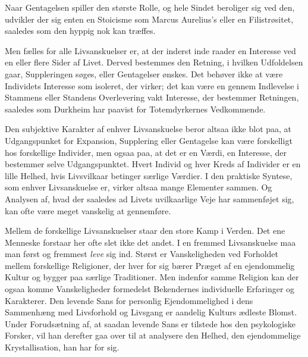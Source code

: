 \documentclass[12pt]{article}
\newcommand{\apage}[1]{\marginnote{\footnotesize\textit{[#1]}}}
\begin{document}
       Naar Gentagelsen spiller den største Rolle, og hele Sindet beroliger sig
ved den, udvikler der sig enten en Stoicisme som Marcus Aurelius's eller en
Filistrøsitet, saaledes som den hyppig nok kan træffes.

Men fælles for alle Livsanskuelser er, at der inderst inde raader en Interesse
ved en eller flere Sider af Livet. Derved bestemmes den Retning, i hvilken
Udfoldelsen gaar, Suppleringen søges, eller Gentagelser ønskes. Det behøver
ikke at være Individets Interesse som isoleret, der virker; det kan være en
gennem Indlevelse i Stammens eller Standens Overlevering vakt Interesse, der
bestemmer Retningen, saaledes som Durkheim har paavist for Totemdyrkernes
Vedkommende.

Den subjektive Karakter af enhver Livsanskuelse beror altsaa ikke blot paa, at
Udgangspunket for Expansion, Supplering eller Gentagelse kan være forskelligt
hos forskellige Individer, men ogsaa paa, at det er en Værdi, en Interesse, der
bestemmer selve Udgangspunktet. Hvert Individ og hver Kreds af Individer er en
lille Helhed, hvis Livsvilkaar betinger særlige Værdier. I den praktiske
Syntese, som enhver Livsanskuelse er, virker altsaa mange Elementer sammen. Og
Analysen af, hvad der saaledes ad Livets uvilkaarlige Veje har sammenføjet sig,
kan ofte være meget vanskelig at gennemføre.

Mellem de forskellige Livsanskuelser staar den store
\setcounter{footnote}{0}%
\apage{69}Kamp i Verden. Det ene Menneske forstaar her ofte slet ikke det
andet. I en fremmed Livsanskuelse maa man først og fremmest \textit{leve} sig
ind. Størst er Vanskeligheden ved Forholdet mellem forskellige Religioner, der
hver for sig bærer Præget af en ejendommelig Kultur og bygger paa særlige
Traditioner. Men indenfor samme Religion kan der ogsaa komme Vanskeligheder
formedelst Bekendernes individuelle Erfaringer og Karakterer. Den levende Sans
for personlig Ejendommelighed i dens Sammenhæng med Livsforhold og Livsgang er
aandelig Kulturs ædleste Blomst. Under Forudsætning af, at saadan levende Sans
er tilstede hos den psykologiske Forsker, vil han derefter gaa over til at
analysere den Helhed, den ejendommelige Krystallisation, han har for sig.
\end{document}
